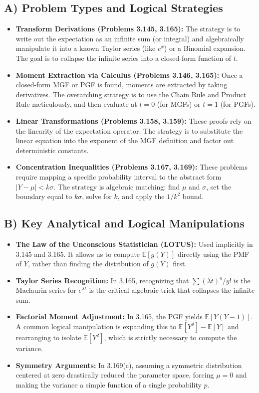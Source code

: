 \documentclass[11pt, a4paper]{article}
\theoremstyle{definition}
\theoremstyle{remark}
\newcommand{\E}{\mathbb{E}}
\begin{document}
\subsection{A) Problem Types and Logical Strategies}
\begin{itemize}
    \item \textbf{Transform Derivations (Problems 3.145, 3.165):} The strategy is to write out the expectation as an infinite sum (or integral) and algebraically manipulate it into a known Taylor series (like $e^x$) or a Binomial expansion. The goal is to collapse the infinite series into a closed-form function of $t$.
    \item \textbf{Moment Extraction via Calculus (Problems 3.146, 3.165):} Once a closed-form MGF or PGF is found, moments are extracted by taking derivatives. The overarching strategy is to use the Chain Rule and Product Rule meticulously, and then evaluate at $t=0$ (for MGFs) or $t=1$ (for PGFs).
    \item \textbf{Linear Transformations (Problems 3.158, 3.159):} These proofs rely on the linearity of the expectation operator. The strategy is to substitute the linear equation into the exponent of the MGF definition and factor out deterministic constants.
    \item \textbf{Concentration Inequalities (Problems 3.167, 3.169):} These problems require mapping a specific probability interval to the abstract form $|Y - \mu| < k\sigma$. The strategy is algebraic matching: find $\mu$ and $\sigma$, set the boundary equal to $k\sigma$, solve for $k$, and apply the $1/k^2$ bound.
\end{itemize}

\subsection{B) Key Analytical and Logical Manipulations}
\begin{itemize}
    \item \textbf{The Law of the Unconscious Statistician (LOTUS):} Used implicitly in 3.145 and 3.165. It allows us to compute $\E[g(Y)]$ directly using the PMF of $Y$, rather than finding the distribution of $g(Y)$ first.
    \item \textbf{Taylor Series Recognition:} In 3.165, recognizing that $\sum (\lambda t)^y / y!$ is the Maclaurin series for $e^{\lambda t}$ is the critical algebraic trick that collapses the infinite sum.
    \item \textbf{Factorial Moment Adjustment:} In 3.165, the PGF yields $\E[Y(Y-1)]$. A common logical manipulation is expanding this to $\E[Y^2] - \E[Y]$ and rearranging to isolate $\E[Y^2]$, which is strictly necessary to compute the variance.
    \item \textbf{Symmetry Arguments:} In 3.169(c), assuming a symmetric distribution centered at zero drastically reduced the parameter space, forcing $\mu=0$ and making the variance a simple function of a single probability $p$.
\end{itemize}
\end{document}
